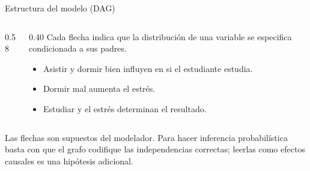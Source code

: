 \documentclass[11pt]{beamer}
\begin{document}
\begin{frame}{Estructura del modelo (DAG)}
  \begin{columns}[T]
    \begin{column}{0.58\textwidth}
      \centering
    \end{column}
    \begin{column}{0.40\textwidth}
      \small
      Cada flecha indica que la distribución de una variable se especifica condicionada a sus padres.
      \begin{itemize}
        \item Asistir y dormir bien influyen en si el estudiante estudia.
        \item Dormir mal aumenta el estrés.
        \item Estudiar y el estrés determinan el resultado.
      \end{itemize}
    \end{column}
  \end{columns}

  \vspace{0.5cm}
  \footnotesize Las flechas son supuestos del modelador. Para hacer inferencia probabilística basta con que el grafo codifique las independencias correctas; leerlas como efectos causales es una hipótesis adicional.
\end{frame}
\end{document}
